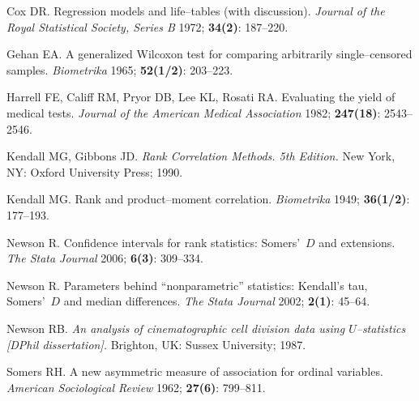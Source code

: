 \documentclass[a4paper,notitlepage]{article}      %
\begin{document}
{\parindent=0pt

\begin{thebibliography}{10}

\smallskip
{}
Cox DR.
Regression models and life--tables (with discussion).
\textsl{Journal of the Royal Statistical Society, Series B} 1972; \textbf{34(2)}: 187--220.

\smallskip
{}
Gehan EA.
A generalized Wilcoxon test for comparing arbitrarily single--censored samples.
\textsl{Biometrika} 1965; \textbf{52(1/2)}: 203--223.

\smallskip
{}
Harrell FE, Califf RM, Pryor DB, Lee KL, Rosati RA.
Evaluating the yield of medical tests.
\textsl{Journal of the American Medical Association} 1982; \textbf{247(18)}: 2543--2546.

\smallskip
{}
Kendall MG, Gibbons JD.
\textsl{Rank Correlation Methods. 5th Edition.}
New York, NY: Oxford University Press; 1990.

\smallskip
{}
Kendall MG.
Rank and product--moment correlation.
\textsl{Biometrika} 1949; \textbf{36(1/2)}: 177--193.

\smallskip
{}
Newson R.
Confidence intervals for rank statistics: Somers'~$D$ and extensions.
\textsl{The Stata Journal} 2006; \textbf{6(3)}: 309--334.

\smallskip
{}
Newson R.
Parameters behind ``nonparametric'' statistics: Kendall's tau, Somers'~$D$ and median differences.
\textsl{The Stata Journal} 2002; \textbf{2(1)}: 45--64.

\smallskip
{}
Newson RB.
\textsl{An analysis of cinematographic cell division data using $U$--statistics
[DPhil dissertation].}
Brighton, UK: Sussex University; 1987.

\smallskip
{}
Somers RH.
A new asymmetric measure of association for ordinal variables.
\textsl{American Sociological Review} 1962; \textbf{27(6)}: 799--811.

\end{thebibliography}

}
\end{document}
